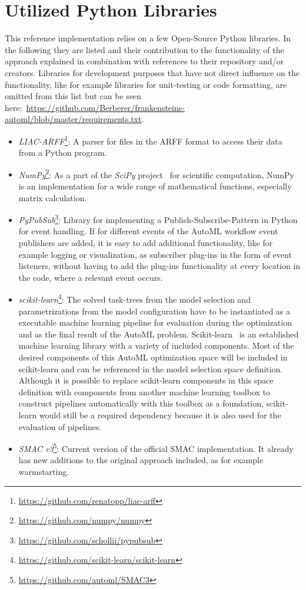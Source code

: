 \section{Utilized Python Libraries}
\label{sec:implementation:libraries}
This reference implementation relies on a few Open-Source Python libraries.
In the following they are listed and their contribution to the functionality of the approach explained in combination with references to their repository and/or creators.
Libraries for development purposes that have not direct influence on the functionality, like for example libraries for unit-testing or code formatting, are omitted from this list but can be seen here:~\url{https://github.com/Berberer/frankensteins-automl/blob/master/requirements.txt}. 
\begin{itemize}
    \item \textit{LIAC-ARFF}\footnote{\url{https://github.com/renatopp/liac-arff}}: A parser for files in the ARFF format to access their data from a Python program.
    \item \textit{NumPy}\footnote{\url{https://github.com/numpy/numpy}}: As a part of the \textit{SciPy} project~\cite{Virtanen-SciPy} for scientific computation, NumPy is an implementation for a wide range of mathematical functions, especially matrix calculation.
    \item \textit{PyPubSub}\footnote{\url{https://github.com/schollii/pypubsub}}: Library for implementing a Publish-Subscribe-Pattern in Python for event handling.
    If for different events of the AutoML workflow event publishers are added, it is easy to add additional functionality, like for example logging or visualization, as subscriber plug-ins in the form of event listeners, without having to add the plug-ins functionality at every location in the code, where a relevant event occurs.
    \item \textit{scikit-learn}\footnote{\url{https://github.com/scikit-learn/scikit-learn}}: The solved task-trees from the model selection and parametrizations from the model configuration have to be instantiated as a executable machine learning pipeline for evaluation during the optimization and as the final result of the AutoML problem.
    Scikit-learn~\cite{Pedregosa-Scikit-learn} is an established machine learning library with a variety of included components.
    Most of the desired components of this AutoML optimization space will be included in scikit-learn and can be referenced in the model selection space definition.
    Although it is possible to replace scikit-learn components in this space definition with components from another machine learning toolbox to construct pipelines automatically with this toolbox as a foundation, scikit-learn would still be a required dependency because it is also used for the evaluation of pipelines.
    \item \textit{SMAC v3}\footnote{\url{https://github.com/automl/SMAC3}}: Current version of the official SMAC implementation. It already has new additions to the original approach included, as for example warmstarting.
\end{itemize}

